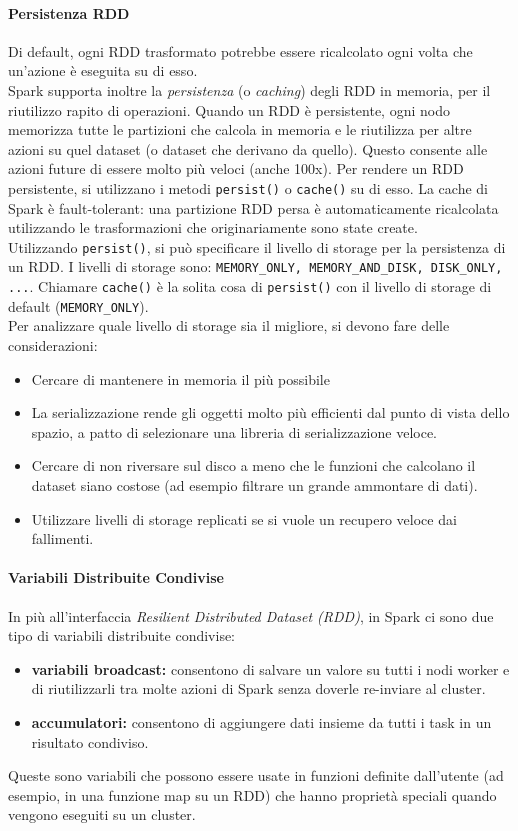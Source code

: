 \documentclass{article}
\begin{document}
\begin{appendices}
\paragraph{Persistenza RDD}
Di default, ogni RDD trasformato potrebbe essere ricalcolato ogni volta che un'azione è eseguita su di esso. \\
Spark supporta inoltre la \textit{persistenza} (o \textit{caching}) degli RDD in memoria, per il riutilizzo rapito di operazioni. Quando un RDD è persistente, ogni nodo memorizza tutte le partizioni che calcola in memoria e le riutilizza per altre azioni su quel dataset (o dataset che derivano da quello). Questo consente alle azioni future di essere molto più veloci (anche 100x). Per rendere un RDD persistente, si utilizzano i metodi \texttt{persist()} o \texttt{cache()} su di esso. La cache di Spark è fault-tolerant: una partizione RDD persa è automaticamente ricalcolata utilizzando le trasformazioni che originariamente sono state create. \\
Utilizzando \texttt{persist()}, si può specificare il livello di storage per la persistenza di un RDD. I livelli di storage sono: \texttt{MEMORY\_ONLY, MEMORY\_AND\_DISK, DISK\_ONLY, ...}. Chiamare \texttt{cache()} è la solita cosa di \texttt{persist()} con il livello di storage di default (\texttt{MEMORY\_ONLY}). \\
Per analizzare quale livello di storage sia il migliore, si devono fare delle considerazioni:
\begin{itemize}
    \item Cercare di mantenere in memoria il più possibile
    \item La serializzazione rende gli oggetti molto più efficienti dal punto di vista dello spazio, a patto di selezionare una libreria di serializzazione veloce.
    \item Cercare di non riversare sul disco a meno che le funzioni che calcolano il dataset siano costose (ad esempio filtrare un grande ammontare di dati).
    \item Utilizzare livelli di storage replicati se si vuole un recupero veloce dai fallimenti.
\end{itemize}

\paragraph{Variabili Distribuite Condivise}
In più all'interfaccia \textit{Resilient Distributed Dataset (RDD)}, in Spark ci sono due tipo di variabili distribuite condivise:
\begin{itemize}
    \item \textbf{variabili broadcast:} consentono di salvare un valore su tutti i nodi worker e di riutilizzarli tra molte azioni di Spark senza doverle re-inviare al cluster.
    \item \textbf{accumulatori:} consentono di aggiungere dati insieme da tutti i task in un risultato condiviso.
\end{itemize}
Queste sono variabili che possono essere usate in funzioni definite dall'utente (ad esempio, in una funzione map su un RDD)  che hanno proprietà speciali quando vengono eseguiti su un cluster.


\end{appendices}
\end{document}
